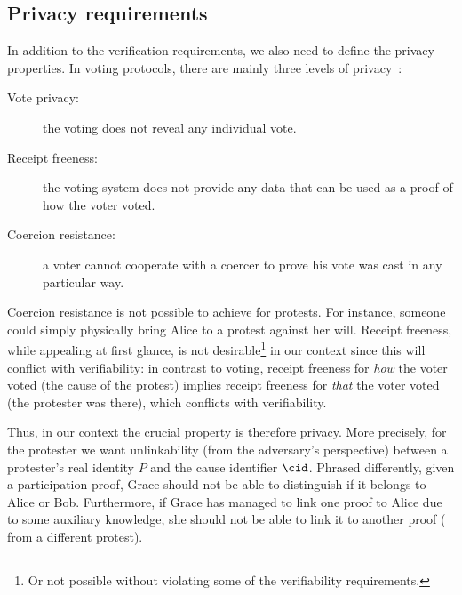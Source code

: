 \subsection{Privacy requirements}%
\label{privacy-properties}

In addition to the verification requirements, we also need to define the privacy properties.
In voting protocols, there are mainly three levels of privacy~\cite{VerifyingPrivacyPropertiesOfVotingProtocols}:
\begin{description}
  \item[Vote privacy:] the voting does not reveal any individual vote.
  \item[Receipt freeness:] the voting system does not provide any data that can be used as a proof of how the voter voted.
  \item[Coercion resistance:] a voter cannot cooperate with a coercer to prove his vote was cast in any particular way.
\end{description}

Coercion resistance is not possible to achieve for protests.
For instance, someone could simply physically bring Alice to a protest against her will.
Receipt freeness, while appealing at first glance, is not desirable\footnote{%
  Or not possible without violating some of the verifiability 
  requirements.
} in our context since this will conflict with verifiability: in contrast to 
voting, receipt freeness for \emph{how} the voter voted (\ie the cause of the 
protest) implies receipt freeness for \emph{that} the voter voted (\ie the 
protester was there), which conflicts with verifiability.

Thus, in our context the crucial property is therefore privacy.
More precisely, for the protester we want unlinkability (from the adversary's 
perspective) between a protester's real identity \(P\) and the cause identifier 
\(\cid\).
Phrased differently, given a participation proof, Grace should not be able to 
distinguish if it belongs to Alice or Bob.
Furthermore, if Grace has managed to link one proof to Alice due to some 
auxiliary knowledge, she should not be able to link it to another proof (\eg 
from a different protest).



